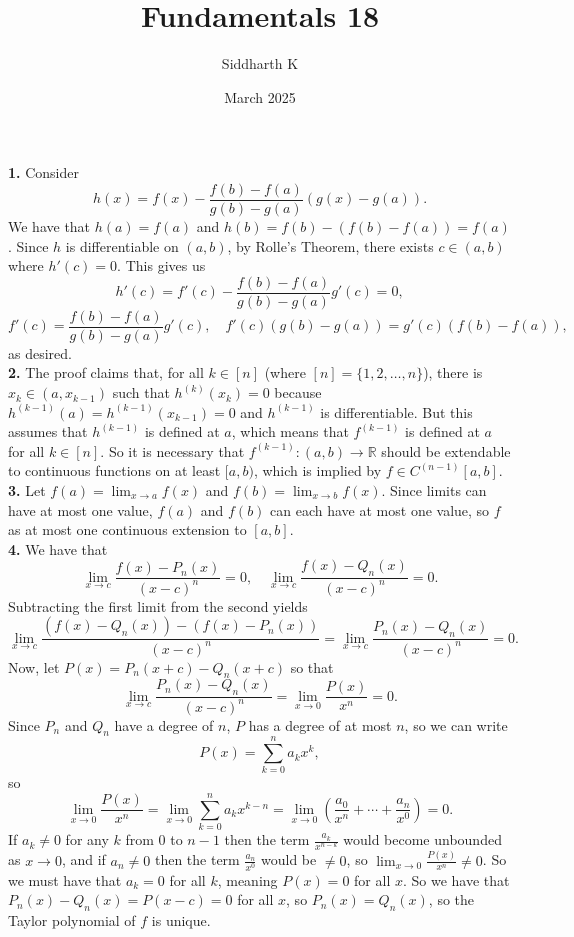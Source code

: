 \documentclass{article}
\title{Fundamentals 18}
\author{Siddharth K}
\date{March 2025}
\newcommand{\R}{\mathbb{R}}
\begin{document}
\maketitle

\textbf{1.} Consider
$$h(x) = f(x) - \frac{f(b) - f(a)}{g(b) - g(a)}(g(x) - g(a)).$$
We have that $h(a) = f(a)$ and $h(b) = f(b) - (f(b) - f(a)) = f(a)$. Since $h$ is differentiable on $(a, b)$, by Rolle's Theorem, there exists $c \in (a, b)$ where $h'(c) = 0$. This gives us
$$h'(c) = f'(c) - \frac{f(b)-  f(a)}{g(b) - g(a)}g'(c) = 0,$$
$$f'(c) = \frac{f(b)-  f(a)}{g(b) - g(a)}g'(c),\quad f'(c)(g(b) - g(a)) = g'(c)(f(b)-  f(a)),$$
as desired. \\

\textbf{2.} The proof claims that, for all $k \in [n]$ (where $[n] = \{1, 2, \ldots, n\}$), there is $x_k \in (a, x_{k - 1})$ such that $h^{(k)}(x_k) = 0$ because $h^{(k-1)}(a) = h^{(k-1)}(x_{k-1}) = 0$ and $h^{(k - 1)}$ is differentiable. But this assumes that $h^{(k-1)}$ is defined at $a$, which means that $f^{(k - 1)}$ is defined at $a$ for all $k \in [n]$. So it is necessary that $f^{(k-1)}: (a, b) \to \R$ should be extendable to continuous functions on at least $[a, b)$, which is implied by $f \in C^{(n - 1)}[a, b]$. \\

\textbf{3.} Let $f(a) = \lim_{x\to a} f(x)$ and $f(b) = \lim_{x\to b}f(x)$. Since limits can have at most one value, $f(a)$ and $f(b)$ can each have at most one value, so $f$ as at most one continuous extension to $[a, b]$. \\

\textbf{4.} We have that
$$\lim_{x \to c}\frac{f(x) - P_n(x)}{(x - c)^n} = 0, \quad \lim_{x \to c}\frac{f(x) - Q_n(x)}{(x - c)^n} = 0.$$
Subtracting the first limit from the second yields
$$\lim_{x \to c}\frac{(f(x) - Q_n(x)) - (f(x) - P_n(x))}{(x - c)^n} = \lim_{x \to c}\frac{P_n(x) - Q_n(x)}{(x - c)^n} = 0.$$
Now, let $P(x) = P_n(x + c) - Q_n(x + c)$ so that
$$\lim_{x \to c}\frac{P_n(x) - Q_n(x)}{(x - c)^n} = \lim_{x\to 0} \frac{P(x)}{x^n} = 0.$$
Since $P_n$ and $Q_n$ have a degree of $n$, $P$ has a degree of at most $n$, so we can write
$$P(x) = \sum_{k = 0}^n a_kx^k,$$
so
$$\lim_{x\to 0} \frac{P(x)}{x^n} = \lim_{x\to 0} \sum_{k = 0}^n a_kx^{k - n} = \lim_{x\to 0} \left(\frac{a_0}{x^n} + \cdots + \frac{a_n}{x^0}\right) = 0.$$
If $a_k \neq 0$ for any $k$ from $0$ to $n-1$ then the term $\frac{a_k}{x^{n - k}}$ would become unbounded as $x \to 0$, and if $a_n \neq 0$ then the term $\frac{a_n}{x^0}$ would be $\neq 0$, so $\lim_{x \to 0} \frac{P(x)}{x^n} \neq 0$. So we must have that $a_k = 0$ for all $k$, meaning $P(x) = 0$ for all $x$. So we have that $P_n(x) - Q_n(x) = P(x - c) = 0$ for all $x$, so $P_n(x) = Q_n(x)$, so the Taylor polynomial of $f$ is unique. \\
\end{document}
